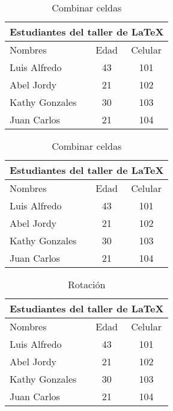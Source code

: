 \documentclass[11pt,a4paper]{article}
\begin{document}
\begin{table}
\begin{center}
\caption{Combinar celdas}
\vspace{1mm}
\begin{tabular}{|l|c|c|}
\hline
\multicolumn{3}{|c|}{Estudiantes del taller de \LaTeX } \\ \hline
Nombres & Edad & Celular \\ \hline
Luis Alfredo & 43 & 101 \\ \hline
Abel Jordy  & 21 &102\\  \hline
Kathy Gonzales & 30 &103\\ \hline
Juan Carlos & 21 &104\\ \hline
\end{tabular}
\end{center}
\end{table}

\begin{table}
\begin{center}
\caption{Combinar celdas}
\vspace{1mm}
\begin{tabular}{|l|c|c|}
\hline
\multicolumn{3}{|c|}{Estudiantes del taller de \LaTeX } \\ \hline
Nombres & Edad & Celular \\ \hline
Luis Alfredo & 43 & 101 \\ \cline{2-3}
Abel Jordy  & 21 &102\\ \cline{1-2} 
Kathy Gonzales & 30 &103\\ 
Juan Carlos & 21 &104\\ \hline
\end{tabular}
\end{center}
\end{table}


\begin{table}[h]
\begin{center}
\begin{sideways}
\begin{tabular}{|l|c|c|}
\hline
\multicolumn{3}{|c|}{Estudiantes del taller de \LaTeX } \\ \hline
Nombres & Edad & Celular \\ \hline
Luis Alfredo & 43 & 101 \\ \cline{2-3}
Abel Jordy  & 21 &102\\ \cline{1-2} 
Kathy Gonzales & 30 &103\\ 
Juan Carlos & 21 &104\\ \hline
\end{tabular}
\end{sideways}
\caption{Rotación}
\end{center}
\end{table}
\end{document}
